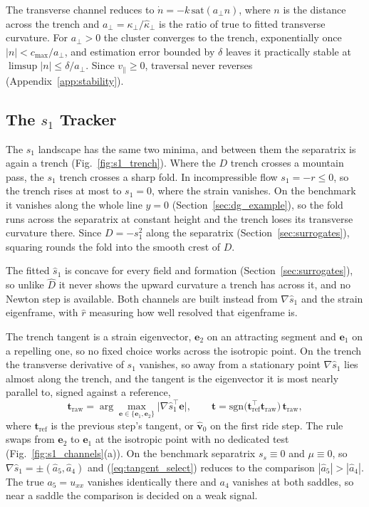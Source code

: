 \documentclass[lettersize,journal]{IEEEtran}
\begin{document}
The transverse channel reduces to $\dot{n} = -k\,\mathrm{sat}(a_\perp n)$,
where $n$ is the distance across the trench and
$a_\perp = \kappa_\perp/\hat{\kappa}_\perp$ is the ratio of true to fitted
transverse curvature. For $a_\perp > 0$ the cluster converges to the
trench, exponentially once $|n| < c_{\max}/a_\perp$, and estimation error
bounded by $\delta$ leaves it practically stable at
$\limsup |n| \leq \delta/a_\perp$. Since $v_\parallel \geq 0$, traversal
never reverses (Appendix~\ref{app:stability}).

\subsection{The $s_1$ Tracker}
\label{sec:s1_controller}

The $s_1$ landscape has the same two minima, and between them the
separatrix is again a trench (Fig.~\ref{fig:s1_trench}). Where the $D$
trench crosses a mountain pass, the $s_1$ trench crosses a sharp fold. In
incompressible flow $s_1 = -r \leq 0$, so the trench rises at most to
$s_1 = 0$, where the strain vanishes. On the benchmark it vanishes along
the whole line $y = 0$ (Section~\ref{sec:dg_example}), so the fold runs
across the separatrix at constant height and the trench loses its
transverse curvature there. Since $D = -s_1^2$ along the separatrix
(Section~\ref{sec:surrogates}), squaring rounds the fold into the smooth
crest of $D$.

The fitted $\hat{s}_1$ is concave for every field and formation
(Section~\ref{sec:surrogates}), so unlike $\hat{D}$ it never shows the
upward curvature a trench has across it, and no Newton step is
available. Both channels are built instead from $\nabla\hat{s}_1$ and the
strain eigenframe, with $\hat{r}$ measuring how well resolved that
eigenframe is.

The trench tangent is a strain eigenvector, $\mathbf{e}_2$ on an
attracting segment and $\mathbf{e}_1$ on a repelling one, so no fixed
choice works across the isotropic point. On the trench the transverse
derivative of $s_1$ vanishes, so away from a stationary point
$\nabla\hat{s}_1$ lies almost along the trench, and the tangent is the
eigenvector it is most nearly parallel to, signed against a reference,
\begin{equation}
    \mathbf{t}_{\mathrm{raw}} =
    \arg\max_{\mathbf{e} \in \{\mathbf{e}_1, \mathbf{e}_2\}}
    \bigl\lvert \nabla\hat{s}_1^\top \mathbf{e} \bigr\rvert,
    \qquad
    \mathbf{t} = \mathrm{sgn}\bigl(\mathbf{t}_{\mathrm{ref}}^\top
    \mathbf{t}_{\mathrm{raw}}\bigr)\,\mathbf{t}_{\mathrm{raw}},
    \label{eq:tangent_select}
\end{equation}
where $\mathbf{t}_{\mathrm{ref}}$ is the previous step's tangent, or
$\hat{\mathbf{v}}_0$ on the first ride step. The rule swaps from
$\mathbf{e}_2$ to $\mathbf{e}_1$ at the isotropic point with no dedicated
test (Fig.~\ref{fig:s1_channels}(a)). On the benchmark separatrix
$s_s \equiv 0$ and $\mu \equiv 0$, so $\nabla\hat{s}_1 = \pm(\hat{a}_5,
\hat{a}_4)$ and (\ref{eq:tangent_select}) reduces to the comparison
$|\hat{a}_5| > |\hat{a}_4|$. The true $a_5 = u_{xx}$ vanishes identically
there and $a_4$ vanishes at both saddles, so near a saddle the comparison
is decided on a weak signal.
\end{document}
